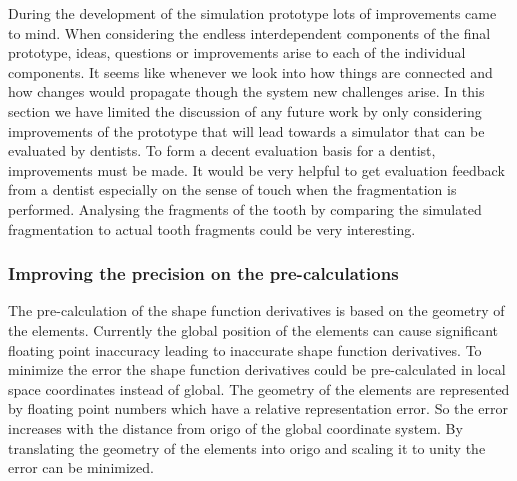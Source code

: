 
During the development of the simulation prototype 
lots of improvements came
to mind. When considering the endless interdependent
components of the final prototype, ideas, questions or improvements
arise to each of the individual components. It seems like whenever we look
into how things are connected and how changes would propagate though the
system new challenges arise.
%
In this section we have limited the discussion of any future work by only
considering improvements of the prototype that will lead towards a
simulator that can be evaluated by dentists. To form a decent
evaluation basis for a dentist, improvements must be made.
It would be very helpful to get evaluation feedback from a dentist
especially on the sense of touch when the fragmentation is
performed. Analysing the fragments of the tooth by comparing the
simulated fragmentation to actual tooth fragments could be very
interesting. \\

\subsubsection*{Improving the precision on the pre-calculations}
The pre-calculation of the shape function derivatives is based on the
geometry of the elements. Currently the global position of the
elements can cause significant floating point inaccuracy leading to
inaccurate shape function derivatives. To minimize the error the shape
function derivatives could be pre-calculated in local space
coordinates instead of global. 
%
The geometry of the
elements are represented by floating point numbers which have a
relative representation error. So the
error increases with the distance from origo of the global coordinate
system. By translating the geometry of
the elements into origo and scaling it to unity the error can be
minimized. \\


